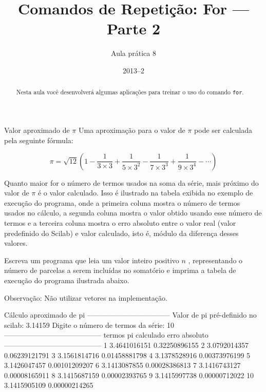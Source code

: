\documentclass[11pt]{practice}
\begin{document}
\subtitle{Aula prática 8}
\title{Comandos de Repetição: For --- Parte 2}
\author{}
\date{2013--2}
\maketitle

\begin{abstract}
  Nesta aula você desenvolverá algumas aplicações para treinar o uso do
  comando \texttt{for}.
\end{abstract}

\tableofcontents

\begin{task}[breakable]{Valor aproximado de $\pi$}{}
  Uma aproximação para o valor de $\pi$ pode ser calculada pela seguinte
  fórmula:

  \[ \pi = \sqrt{12} ( 1 - \frac{1}{3\times 3} + \frac{1}{5\times 3^2} - \frac{1}{7\times 3^3} + \frac{1}{9\times 3^4} - \cdots ) \]

  Quanto maior for o número de termos usados na soma da série, mais
  próximo do valor de $\pi$ é o valor calculado. Isso é ilustrado na
  tabela exibida no exemplo de execução do programa, onde a primeira
  coluna mostra o número de termos usados no cálculo, a segunda coluna
  mostra o valor obtido usando esse número de termos e a terceira coluna
  mostra o erro absoluto entre o valor real (valor predefinido do
  Scilab) e valor calculado, isto é, módulo da diferença desses valores.

  Escreva um programa que leia um valor inteiro positivo $n$ ,
  representando o número de parcelas a serem incluídas no
  somatório e imprima a tabela de execução do programa ilustrada abaixo.

  Observação: Não utilizar vetores na implementação.

  \begin{runexample}
Cálculo aproximado de pi
-----------------------------------
Valor de pi pré-definido no scilab: 3.14159
Digite o número de termos da série: 10
-----------------------------------------
termos  pi calculado  erro absoluto
-----------------------------------------
     1  3.4641016151  0.32250896155
     2  3.0792014357  0.06239121791
     3  3.1561814716  0.01458881798
     4  3.1378528916  0.00373976199
     5  3.1426047457  0.00101209207
     6  3.1413087855  0.00028386813
     7  3.1416743127  0.00008165911
     8  3.1415687159  0.00002393765
     9  3.1415997738  0.00000712022
    10  3.1415905109  0.00000214265
  \end{runexample}


\end{task}
\end{document}
